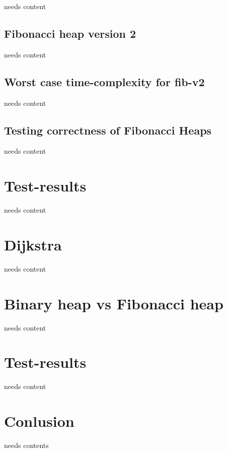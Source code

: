 \documentclass[12pt,a4paper,twoside,danish,article]{memoir}
\begin{document}
needs content

\section{Fibonacci heap version 2}

needs content

\section{Worst case time-complexity for fib-v2}

needs content

\section{Testing correctness of Fibonacci Heaps}

needs content

\chapter{Test-results}

needs content

\chapter{Dijkstra}

needs content

\chapter{Binary heap vs Fibonacci heap}

needs content

\chapter{Test-results}

needs content

\chapter{Conlusion}

needs contents
\end{document}
